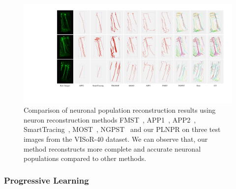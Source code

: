 \begin{figure}[t]
	\centering
	\includegraphics[width=1\textwidth]{./Illustrations/iteration3.pdf}
	\caption{Comparison of neuronal population reconstruction results using neuron reconstruction methods FMST~\cite{Yang2018}, APP1~\cite{Peng2011}, APP2~\cite{Xiao2013}, SmartTracing~\cite{Chen2015}, MOST~\cite{Wu2014}, NGPST~\cite{Quan2015} and our PLNPR on three test images from the VISoR-40 dataset.
	We can observe that, our method reconstructs more complete and accurate neuronal populations compared to other methods.
	}
	\label{fig:compare_VISoR}
\end{figure}

\subsubsection{Progressive Learning}


